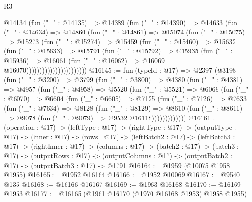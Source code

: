 \begin{lexlean}{R3}
\begin{coremodule}
                          @14134
                            (fun ("_" : @14135) =>
                            @14389
                              (fun ("_" : @14390) =>
                              @14633
                                (fun ("_" : @14634) =>
                                @14860
                                  (fun ("_" : @14861) =>
                                  @15074
                                    (fun ("_" : @15075) =>
                                    @15273
                                      (fun ("_" : @15274) =>
                                      @15459
                                        (fun ("_" : @15460) =>
                                        @15632
                                          (fun ("_" : @15633) =>
                                          @15791
                                            (fun ("_" : @15792) =>
                                            @15935
                                              (fun ("_" : @15936) =>
                                              @16061
                                                (fun ("_" : @16062) =>
                                                @16069 @16070)))))))))))))))))))))))
@16145 := fun (typeId : @17) =>
  @2397
    (@3198
      (fun ("_" : @3200) =>
      @3799
        (fun ("_" : @3800) =>
        @4380
          (fun ("_" : @4381) =>
          @4957
            (fun ("_" : @4958) =>
            @5520
              (fun ("_" : @5521) =>
              @6069
                (fun ("_" : @6070) =>
                @6604
                  (fun ("_" : @6605) =>
                  @7125
                    (fun ("_" : @7126) =>
                    @7633
                      (fun ("_" : @7634) =>
                      @8128
                        (fun ("_" : @8129) =>
                        @8610
                          (fun ("_" : @8611) =>
                          @9078 (fun ("_" : @9079) => @9532 @16118)))))))))))))
@16161 := (operation : @17) ->
  (leftType : @17) ->
  (rightType : @17) ->
  (outputType : @17) ->
  (inner : @17) ->
  (rows : @17) ->
  (leftBatch2 : @17) ->
  (leftBatch3 : @17) ->
  (rightInner : @17) ->
  (columns : @17) ->
  (batch2 : @17) ->
  (batch3 : @17) ->
  (outputRows : @17) ->
  (outputColumns : @17) -> (outputBatch2 : @17) -> (outputBatch3 : @17) -> @1791
@16164 := @1959 (@10075 @1958 @1955)
@16165 := @1952 @16164
@16166 := @1952 @10069
@16167 := @9540 @135
@16168 := @16166 @16167
@16169 := @1963 @16168
@16170 := @16169 @1953
@16177 := @16165 (@1961 @16170 (@1970 @16168 @1953) @1958 @1955)

\end{coremodule}
\end{lexlean}
